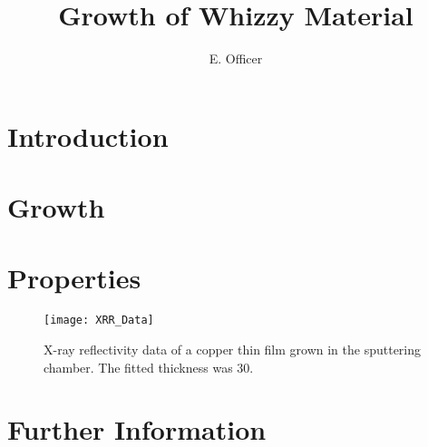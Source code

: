 \documentclass[twocolumn, twoside,11pt,A4]{article}%
\begin{document}
\author{E. Officer}
\title{Growth of Whizzy Material}	
	
\section{Introduction}
\blindtext \cite{Mathur1997}
\blindtext \cite{AlMaMari2015}
\section{Growth}
\blindtext \cite{Hueso2007}
\blindtext \cite{Flokstra2015a}
\blindtext \cite{Shi2017}
\section{Properties}
\begin{figure}
	\centering
	\texttt{[image: XRR\_Data]}
	\label{xrr_data}
	\caption{X-ray reflectivity data of a copper thin film grown in the sputtering chamber. The fitted thickness was 30.}
\end{figure}
\blindtext \cite{Benitez2015}
\blindtext 
\blindtext 
\section{Further Information}
\blindtext 

\printbibliography
\end{document}

